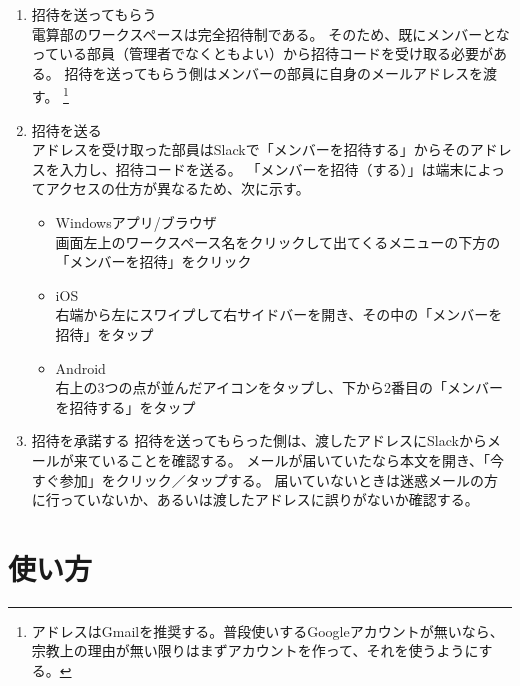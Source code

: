 \documentclass[lualatex,ja=standard,12pt,a4j]{bxjsbook}
\begin{document}
            \begin{enumerate}
            	\item 招待を送ってもらう\\
                	電算部のワークスペースは完全招待制である。
                    そのため、既にメンバーとなっている部員（管理者でなくともよい）から招待コードを受け取る必要がある。
                    招待を送ってもらう側はメンバーの部員に自身のメールアドレスを渡す。
                    \footnote{アドレスはGmailを推奨する。普段使いするGoogleアカウントが無いなら、宗教上の理由が無い限りはまずアカウントを作って、それを使うようにする。}
                \item 招待を送る\\
                	アドレスを受け取った部員はSlackで「メンバーを招待する」からそのアドレスを入力し、招待コードを送る。
                    「メンバーを招待（する）」は端末によってアクセスの仕方が異なるため、次に示す。
                    \begin{itemize}
                    	\item Windowsアプリ/ブラウザ\\
                        	画面左上のワークスペース名をクリックして出てくるメニューの下方の「メンバーを招待」をクリック
                        \item iOS\\
                        	右端から左にスワイプして右サイドバーを開き、その中の「メンバーを招待」をタップ
                        \item Android\\
                        	右上の3つの点が並んだアイコンをタップし、下から2番目の「メンバーを招待する」をタップ
                    \end{itemize}
                \item 招待を承諾する
                	招待を送ってもらった側は、渡したアドレスにSlackからメールが来ていることを確認する。
                    メールが届いていたなら本文を開き、「今すぐ参加」をクリック／タップする。
                    届いていないときは迷惑メールの方に行っていないか、あるいは渡したアドレスに誤りがないか確認する。
            \end{enumerate}
            
   		\section{使い方}
\end{document}
